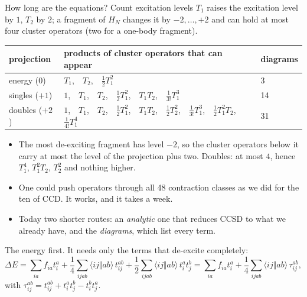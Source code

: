 \documentclass[aspectratio=169,10pt]{beamer}
\newcommand{\as}[4]{\langle #1#2\Vert #3#4\rangle}
\begin{document}
\begin{frame}[shrink=1]{How long are the equations? Count excitation levels}
\small
$T_1$ raises the excitation level by $1$, $T_2$ by $2$; a fragment of $H_N$ changes it by $-2,\dots,+2$ and can hold at most four cluster operators (two for a one-body fragment).
\begin{center}
\renewcommand{\arraystretch}{1.3}
\begin{tabular}{lll}
\toprule
projection & products of cluster operators that can appear & diagrams\\
\midrule
energy ($0$) & $T_1$,\ \ $T_2$,\ \ $\tfrac12T_1^2$ & 3\\
singles ($+1$) & $1$,\ \ $T_1$,\ \ $T_2$,\ \ $\tfrac12T_1^2$,\ \ $T_1T_2$,\ \ $\tfrac1{3!}T_1^3$ & 14\\
doubles ($+2$) & $1$,\ \ $T_1$,\ \ $T_2$,\ \ $\tfrac12T_1^2$,\ \ $T_1T_2$,\ \ $\tfrac12T_2^2$,\ \ $\tfrac1{3!}T_1^3$,\ \ $\tfrac12T_1^2T_2$,\ \ $\tfrac1{4!}T_1^4$ & 31\\
\bottomrule
\end{tabular}
\end{center}
\begin{itemize}
\item The most de-exciting fragment has level $-2$, so the cluster operators below it carry at most the level of the projection plus two. Doubles: at most $4$, hence $T_1^4$, $T_1^2T_2$, $T_2^2$ and nothing higher.
\item One could push operators through all 48 contraction classes as we did for the ten of CCD. It works, and it takes a week.
\item Today two shorter routes: an \emph{analytic} one that reduces CCSD to what we already have, and the \emph{diagrams}, which list every term.
\end{itemize}
The energy first. It needs only the terms that de-excite completely:
\[
 \Delta E=\sum_{ia}f_{ia}t_i^a+\frac14\sum_{ijab}\as ijab\,t_{ij}^{ab}+\frac12\sum_{ijab}\as ijab\,t_i^at_j^b
 =\sum_{ia}f_{ia}t_i^a+\frac14\sum_{ijab}\as ijab\,\tau_{ij}^{ab},
\]
with $\tau_{ij}^{ab}=t_{ij}^{ab}+t_i^at_j^b-t_i^bt_j^a$.
\end{frame}
\end{document}
